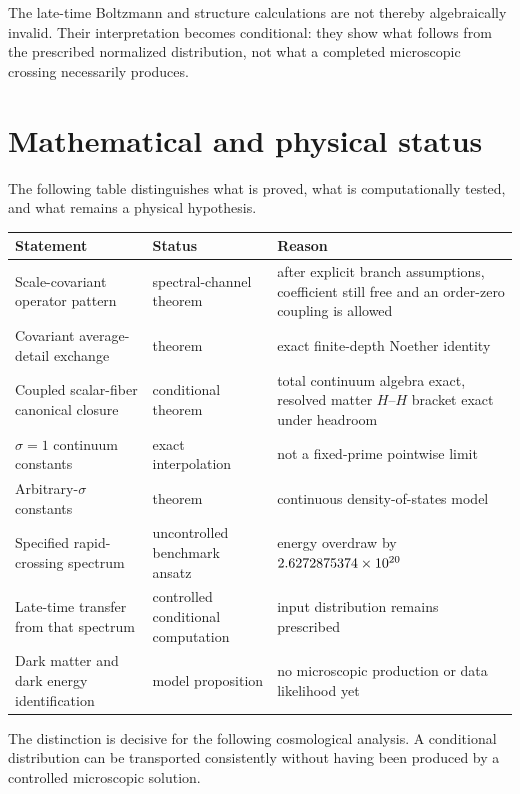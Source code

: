 The late-time Boltzmann and structure calculations are not thereby algebraically invalid.  Their interpretation becomes conditional: they show what follows from the prescribed normalized distribution, not what a completed microscopic crossing necessarily produces.

\section{Mathematical and physical status}

The following table distinguishes what is proved, what is computationally tested, and what remains a physical hypothesis.

\begin{longtable}{@{}P{0.33\textwidth}P{0.24\textwidth}P{0.33\textwidth}@{}}
\toprule
Statement & Status & Reason\\
\midrule
Scale-covariant operator pattern & spectral-channel theorem & after explicit branch assumptions, coefficient still free and an order-zero coupling is allowed\\
Covariant average-detail exchange & theorem & exact finite-depth Noether identity\\
Coupled scalar-fiber canonical closure & conditional theorem & total continuum algebra exact, resolved matter $H$--$H$ bracket exact under headroom\\
$\sigma=1$ continuum constants & exact interpolation & not a fixed-prime pointwise limit\\
Arbitrary-$\sigma$ constants & theorem & continuous density-of-states model\\
Specified rapid-crossing spectrum & uncontrolled benchmark ansatz & energy overdraw by $2.6272875374\times 10^{20}$\\
Late-time transfer from that spectrum & controlled conditional computation & input distribution remains prescribed\\
Dark matter and dark energy identification & model proposition & no microscopic production or data likelihood yet\\
\bottomrule
\end{longtable}

The distinction is decisive for the following cosmological analysis. A conditional distribution can be transported consistently without having been produced by a controlled microscopic solution.
